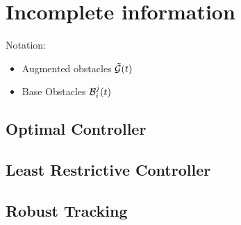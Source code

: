 \section{Incomplete information \label{sec:incomp}}
Notation:
\begin{itemize}
\item Augmented obstacles $\tilde{\mathcal{G}}(t)$
\item Base Obstacles $\mathcal{B}_i^j(t)$
\end{itemize}

\subsection{Optimal Controller} \label{sec:incomp_optctrl}
\subsection{Least Restrictive Controller}  \label{sec:incomp_LRctrl}
\subsection{Robust Tracking}